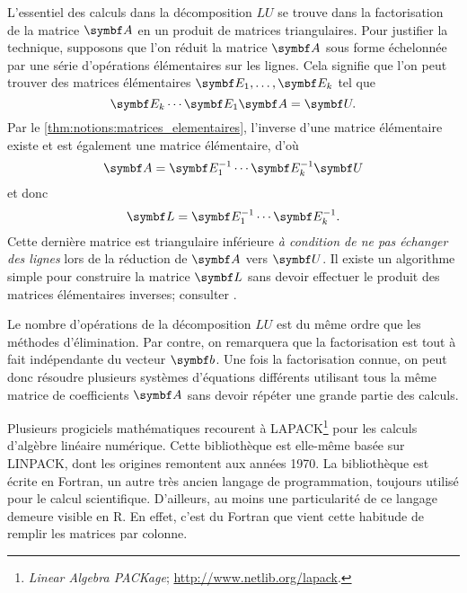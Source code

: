 L'essentiel des calculs dans la décomposition $LU$ se trouve dans la
factorisation de la matrice $\mat{A}$ en un produit de matrices
triangulaires. Pour justifier la technique, supposons que l'on réduit
la matrice $\mat{A}$ sous forme échelonnée par une série d'opérations
élémentaires sur les lignes. Cela signifie que l'on peut trouver des matrices
élémentaires $\mat{E}_1, \dots, \mat{E}_k$ tel que
\begin{displaymath}
  \mat{E}_k \cdots \mat{E}_1 \mat{A} = \mat{U}.
\end{displaymath}
Par le \autoref{thm:notions:matrices_elementaires}, l'inverse
d'une matrice élémentaire existe et est également une matrice
élémentaire, d'où
\begin{displaymath}
  \mat{A} = \mat{E}_1^{-1} \cdots \mat{E}_k^{-1} \mat{U}
\end{displaymath}
et donc
\begin{displaymath}
  \mat{L} = \mat{E}_1^{-1} \cdots \mat{E}_k^{-1}.
\end{displaymath}
Cette dernière matrice est triangulaire inférieure \emph{à condition
  de ne pas échanger des lignes} lors de la réduction de $\mat{A}$
vers $\mat{U}$.  Il existe un algorithme simple pour construire la
matrice $\mat{L}$ sans devoir effectuer le produit des matrices
élémentaires inverses; consulter \citet[section 9.9]{Anton:linear:8e:2000}.

Le nombre d'opérations de la décomposition $LU$ est du même ordre que
les méthodes d'élimination. Par contre, on remarquera que la
factorisation est tout à fait indépendante du vecteur $\mat{b}$. Une
fois la factorisation connue, on peut donc résoudre plusieurs systèmes
d'équations différents utilisant tous la même matrice de coefficients
$\mat{A}$ sans devoir répéter une grande partie des calculs.

\begin{rem}
  Plusieurs progiciels mathématiques recourent à  LAPACK\footnote{%
    \emph{Linear Algebra PACKage};
    \url{http://www.netlib.org/lapack}.} %
  pour les calculs d'algèbre linéaire numérique. Cette bibliothèque
  est elle-même basée sur LINPACK, dont les origines remontent aux
  années 1970. La bibliothèque est écrite en Fortran, un autre très
  ancien langage de programmation, toujours utilisé pour le calcul
  scientifique. D'ailleurs, au moins une particularité de ce langage
  demeure visible en R. En effet, c'est du Fortran que vient cette
  habitude de remplir les matrices par colonne.
\end{rem}


